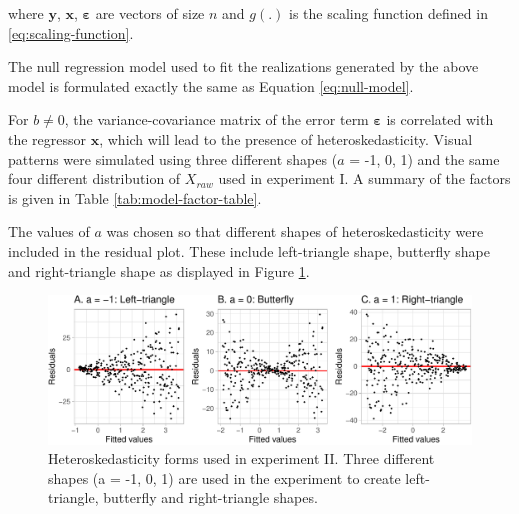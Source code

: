 \documentclass[]{interact}
\theoremstyle{plain}%
\theoremstyle{definition}
\theoremstyle{remark}
\begin{document}
\noindent where \(\boldsymbol{y}\), \(\boldsymbol{x}\),
\(\boldsymbol{\varepsilon}\) are vectors of size \(n\) and \(g(.)\) is
the scaling function defined in \ref{eq:scaling-function}.

The null regression model used to fit the realizations generated by the
above model is formulated exactly the same as Equation
\ref{eq:null-model}.

For \(b \neq 0\), the variance-covariance matrix of the error term
\(\boldsymbol{\varepsilon}\) is correlated with the regressor
\(\boldsymbol{x}\), which will lead to the presence of
heteroskedasticity. Visual patterns were simulated using three different
shapes (\(a\) = -1, 0, 1) and the same four different distribution of
\(X_{raw}\) used in experiment I. A summary of the factors is given in
Table \ref{tab:model-factor-table}.

The values of \(a\) was chosen so that different shapes of
heteroskedasticity were included in the residual plot. These include
left-triangle shape, butterfly shape and right-triangle shape as
displayed in Figure \ref{fig:different-shape-of-heter}.

\begin{figure}

{\centering \includegraphics[width=1\linewidth]{paper_comparison_files/figure-latex/different-shape-of-heter-1} 

}

\caption{Heteroskedasticity forms used in experiment II. Three different shapes (a = -1, 0, 1) are used in the experiment to create left-triangle, butterfly and right-triangle shapes.}\label{fig:different-shape-of-heter}
\end{figure}
\end{document}
